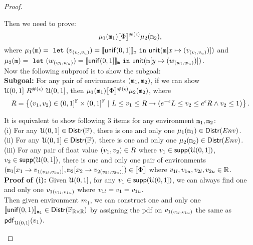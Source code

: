 \documentclass[a4paper,11pt]{article}
\begin{document}
\begin{proof}
\begin{itemize}
	Then we need to prove:
	\[\mu_1(\mathtt{m}_1) \llbracket \Phi \rrbracket^{\#(\epsilon)} \mu_2(\mathtt{m}_2),\]
	where 
	$\mu_1(\mathtt{m}) = 
	~\mathtt{let}~ (v_{(v_{l}, v_{u})}) 
	= \llbracket \mathsf{unif}(0, 1] \rrbracket_{\mathtt{m}} 
	~\mathtt{in}~ 
	\mathsf{unit}(\mathtt{m}[x \mapsto (v_{(v_{l}, v_{u})})])$ and
	\\
	$\mu_2(\mathtt{m}) = 
	~\mathtt{let}~ (w_{(w_{l}, w_{u})})
	= \llbracket \mathsf{unif}(0, 1] \rrbracket_{\mathtt{m}} 
	~\mathtt{in}~ 
	\mathsf{unit}(\mathtt{m}[y \mapsto (w_{(w_{l}, w_{u})})])$.
	\\
	Now the following subproof is to show the subgoal:
	\\
	\textbf{Subgoal:} For any pair of environments $(\mathtt{m}_1, \mathtt{m}_2)$, if we can show ${\mathcal{U}(0,1]} ~ R^{\#(\epsilon)} ~ {\mathcal{U}(0,1]}$, then $\mu_1(\mathtt{m}_1) \llbracket \Phi \rrbracket^{\#(\epsilon)} \mu_2(\mathtt{m}_2)$,
	where
	\[
		R = 
		\left \{(v_1, v_2) \in (0,1]^{\mathbb{F}} \times (0,1]^{\mathbb{F}} 
		~|~
		L \leq v_1 \leq R
		\rightarrow
		(e^{-\epsilon} L \leq v_2 \leq 	e^{\epsilon} R
		\land v_2 \leq 1)
		\right \}.
	\]
	\begin{subproof}
	It is equivalent to show following 3 items for any environment $\mathtt{m}_1, \mathtt{m}_2$:
	\\
	(i) For any $\mathcal{U}(0,1]\in \mathsf{Distr}(\mathbb{F})$, there is one and only one $\mu_1(\mathtt{m}_1) \in \mathsf{Distr}(Env)$.
	\\
	(ii) For any $\mathcal{U}(0,1] \in \mathsf{Distr}(\mathbb{F})$, there is one and only one $\mu_2(\mathtt{m}_2) \in \mathsf{Distr}(Env)$.
	\\
	(iii) For any pair of float value $(v_1, v_2) \in R$ where 
	$v_1 \in \mathsf{supp}(\mathcal{U}(0,1])$, 
	$v_2 \in \mathsf{supp}(\mathcal{U}(0,1])$,
	there is one and only one pair of environments 
	$(\mathtt{m}_1[ x_1 \to v_{1(v_{1l}, v_{1u})}], \mathtt{m}_2[x_2 \to v_{2(v_{2l}, v_{2u})}]) \in \llbracket \Phi \rrbracket$
	where $v_{1l}, v_{1u}, v_{2l}, v_{2u} \in \mathbb{R}$.
	\\ 
	\textbf{Proof of (i):} 
	Given $\mathcal{U}(0,1]$, for any $v_1 \in \mathsf{supp}(\mathcal{U}(0,1])$, 
	we can always find one and only one $v_{1(v_{1l}, v_{1u})}$ where $v_{1l} = v_1 = v_{1u}$.
	\\
	Then given environment $m_1$,
	we can construct one and only one $\llbracket \mathsf{unif}(0, 1) \rrbracket_{\mathtt{m}_1} \in \mathsf{Distr}(\mathbb{F}_{\mathbb{R} \times \mathbb{R}})$
	by assigning the pdf on $v_{1(v_{1l}, v_{1u})}$ the same as $\mathsf{pdf}_{\mathcal{U}(0,1]}(v_1)$. 
	\\

\end{subproof}
\end{itemize}
\end{proof}
\end{document}
